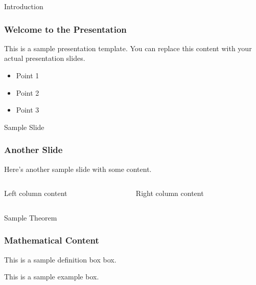 
\begin{frame}{Introduction}
\frametitle{Welcome to the Presentation}

This is a sample presentation template. You can replace this content with your actual presentation slides.

\begin{itemize}
    \item Point 1
    \item Point 2
    \item Point 3
\end{itemize}

\end{frame}

\begin{frame}{Sample Slide}
\frametitle{Another Slide}

Here's another sample slide with some content.

\begin{columns}
\begin{column}{0.5\textwidth}
Left column content
\end{column}
\begin{column}{0.5\textwidth}
Right column content
\end{column}
\end{columns}

\end{frame}

\begin{frame}{Sample Theorem}
\frametitle{Mathematical Content}

\begin{ApBox}
This is a sample definition box box.
\end{ApBox}

\begin{PavBox}
This is a sample example box.
\end{PavBox}

\end{frame}
